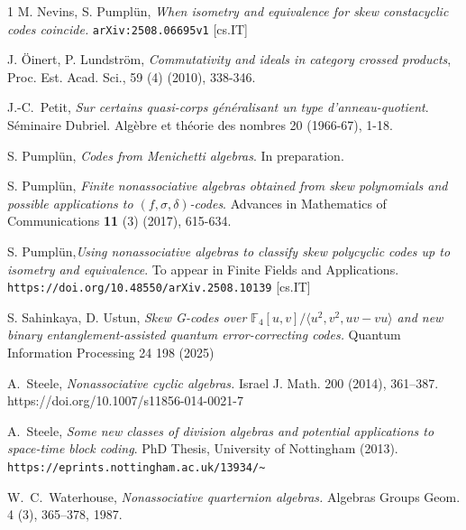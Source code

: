 \documentclass[11pt]{amsart}
\theoremstyle{plain}
\theoremstyle{definition}
\begin{document}
\begin{thebibliography}{1}
  M. Nevins, S. Pumpl\"un,  \emph{When isometry and equivalence for skew constacyclic codes coincide.}
\verb#arXiv:2508.06695v1# [cs.IT]

 J. \"Oinert, P. Lundstr\"om,
     \emph{Commutativity and ideals in category crossed products},
   Proc. Est. Acad. Sci.,
    59 (4)  (2010), 338-346.

 J.-C.~Petit, \emph{Sur certains quasi-corps g\'{e}n\'{e}ralisant un type d'anneau-quotient}.
 S\'{e}minaire Dubriel. Alg\`{e}bre et th\'{e}orie des nombres 20 (1966-67), 1-18.


 S. Pumpl\"un,  \emph{Codes from Menichetti algebras}. In preparation.


 S. Pumpl\"un, \emph{Finite nonassociative algebras obtained from skew polynomials  and possible applications to $(f,\sigma,\delta)$-codes}.
Advances in Mathematics of Communications  \textbf{11} (3) (2017), 615-634.

  S. Pumpl\"un,\emph{Using nonassociative algebras to classify skew polycyclic codes up to isometry and equivalence}.
To appear in Finite Fields and Applications.
\verb#https://doi.org/10.48550/arXiv.2508.10139# [cs.IT]

   S. Sahinkaya, D. Ustun, \emph{Skew G-codes over $\mathbb {F}_4[u,v]/\langle u^2, v^2, uv-vu \rangle $ and new binary entanglement-assisted quantum error-correcting codes.} Quantum Information Processing 24 198 (2025)



 A.~Steele, \emph{Nonassociative cyclic algebras.} Israel J. Math. 200 (2014), 361–387.
https://doi.org/10.1007/s11856-014-0021-7

 A.~Steele, \emph{Some new classes of division algebras and potential applications to space-time block coding}. PhD Thesis, University of Nottingham (2013).
    \verb#https://eprints.nottingham.ac.uk/13934/~#

 W.~C.~Waterhouse, \emph{Nonassociative quarternion algebras.} Algebras Groups Geom.
4 (3), 365–378, 1987.


\end{thebibliography}
\end{document}
